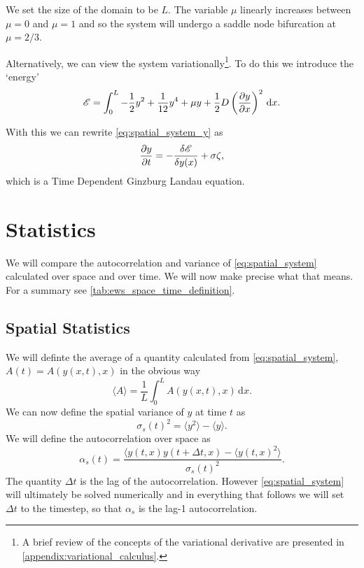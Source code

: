 We set the size of the domain to be $L$. The variable $\mu$ linearly increases between $\mu = 0$ and $\mu = 1$ and so the system will undergo a saddle node
bifurcation at $\mu = 2/3$.

Alternatively, we can view the system variationally\footnote{A brief review of the concepts of the variational derivative are presented in \cref{appendix:variational_calculus}.}.
To do this we introduce the `energy'
\begin{equation}
  \label{eq:spatial_system_energy}
  \mathscr{E} = \int_0^L -\frac{1}{2}y^2 + \frac{1}{12}y^4 + \mu y + \frac{1}{2}D\left(\pdv{y}{x}\right)^2\,\mathrm{d}{x}.
\end{equation}

With this we can rewrite \cref{eq:spatial_system_y} as
\begin{equation}
  \label{eq:spatial_system_y_variational}
    \pdv{y}{t} = -\fdv{\mathscr{E}}{y(x)}  + \sigma\zeta, 
\end{equation}
which is a Time Dependent Ginzburg Landau equation.

\section{Statistics}
We will compare the autocorrelation and variance of \cref{eq:spatial_system} calculated over space and over time. We will now
make precise what that means. For a summary see \cref{tab:ews_space_time_definition}.

\subsection{Spatial Statistics}

We will definte the average of a quantity calculated from \cref{eq:spatial_system}, $A(t) = A(y(x,t),x)$ in the obvious way
\begin{equation}
  \label{eq:definition_of_average}
  \langle A \rangle = \frac{1}{L}\int_0^L A(y(x,t),x) \,\mathrm{d}x.
\end{equation}
We can now define the spatial variance of $y$ at time $t$ as
\begin{equation}
  \label{eq:spatial_variance}
  \sigma_s(t)^2 = \langle y^2 \rangle - \langle y \rangle.
\end{equation}
We will define the autocorrelation over space as
\begin{equation}
  \label{eq:spatial_autocorrelation}
  \alpha_s(t) = \frac{\langle y(t,x)y(t+\Delta t,x) - \langle y(t,x)^2 \rangle }{\sigma_s(t)^2}.
\end{equation}
The quantity $\Delta t$ is the lag of the autocorrelation. However \cref{eq:spatial_system} will ultimately be solved numerically and
in everything that follows we will set $\Delta t$ to the timestep, so that $\alpha_s$ is the lag-1 autocorrelation.


